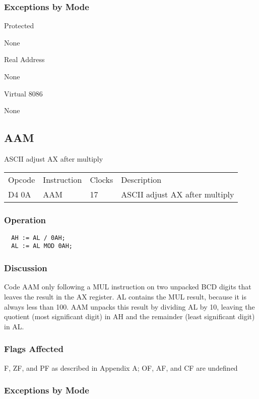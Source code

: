 \subsubsection{Exceptions by Mode}

Protected

None

Real Address

None

Virtual 8086

None

\subsection*{AAM}

ASCII adjust AX after multiply

\begin{tabular}{l l l l}
Opcode & Instruction & Clocks & Description\\
D4 0A & AAM & 17 & ASCII adjust AX after multiply\\
\end{tabular}

\subsubsection{Operation}
\begin{verbatim}
  AH := AL / 0AH; 
  AL := AL MOD 0AH;
\end{verbatim}

\subsubsection{Discussion}

Code AAM only following a MUL instruction on two unpacked BCD digits that leaves the result in the AX register. AL contains the MUL result, because it is always less than 100. AAM unpacks this result by dividing AL by 10, leaving the quotient (most significant digit) in AH and the remainder (least significant digit) in AL.

\subsubsection{Flags Affected}
F, ZF, and PF as described in Appendix A; OF, AF, and CF are undefined

\subsubsection{Exceptions by Mode} 

